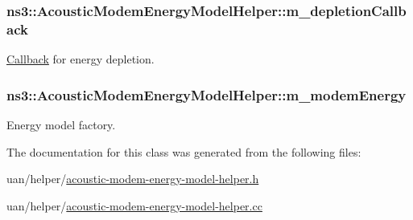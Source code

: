 \subsubsection[{\texorpdfstring{m\+\_\+depletion\+Callback}{m_depletionCallback}}]{ ns3\+::\+Acoustic\+Modem\+Energy\+Model\+Helper\+::m\+\_\+depletion\+Callback\hspace{0.3cm}{\ttfamily [private]}}\hypertarget{classns3_1_1AcousticModemEnergyModelHelper_a3b1b49f8077c22354bb5eccff83d3910}{}\label{classns3_1_1AcousticModemEnergyModelHelper_a3b1b49f8077c22354bb5eccff83d3910}
\hyperlink{classns3_1_1Callback}{Callback} for energy depletion. 
\subsubsection[{\texorpdfstring{m\+\_\+modem\+Energy}{m_modemEnergy}}]{ ns3\+::\+Acoustic\+Modem\+Energy\+Model\+Helper\+::m\+\_\+modem\+Energy\hspace{0.3cm}{\ttfamily [private]}}\hypertarget{classns3_1_1AcousticModemEnergyModelHelper_a1bd2876f2988dd9e4eb51013d4f553e1}{}\label{classns3_1_1AcousticModemEnergyModelHelper_a1bd2876f2988dd9e4eb51013d4f553e1}
Energy model factory. 

The documentation for this class was generated from the following files\+:\begin{DoxyCompactItemize}
\item 
uan/helper/\hyperlink{acoustic-modem-energy-model-helper_8h}{acoustic-\/modem-\/energy-\/model-\/helper.\+h}\item 
uan/helper/\hyperlink{acoustic-modem-energy-model-helper_8cc}{acoustic-\/modem-\/energy-\/model-\/helper.\+cc}\end{DoxyCompactItemize}
